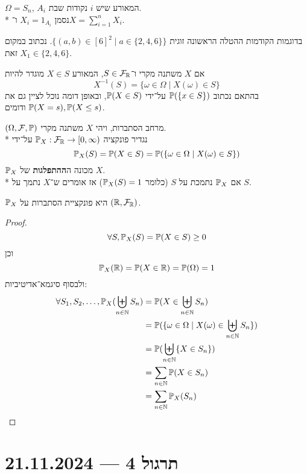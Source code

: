 \begin{example}
	$\Omega = S_n$, $A_i$ המאורע שיש $i$ נקודות שבת. \\*
	נסמן $X_i = 1_{A_i}$ ו־$X = \sum_{i = 1}^n X_i$.
\end{example}
בדוגמות הקודמות ההטלה הראשונה זוגית $\{ (a, b) \in {[6]}^2 \mid a \in \{2, 4, 6\}\}$. נכתוב במקום זאת $X_1 \in \{2, 4, 6\}$.
\begin{definition}
	אם $X$ משתנה מקרי ו־$S \in \mathcal{F}_{\mathbb{R}}$, המאורע $X \in S$ מוגדר להיות
	\[
		X^{-1}(S) = \{ \omega \in \Omega \mid X(\omega) \in S \}
	\]
	בהתאם נכתוב $\mathbb{P}(\{x \in S\})$ על־ידי $\mathbb{P}(X \in S)$, ובאופן דומה נוכל לציין גם את $\mathbb{P}(X = s), \mathbb{P}(X \le s)$ ודומים.
\end{definition}
\begin{definition}
	$(\Omega, \mathcal{F}, \mathbb{P})$ מרחב הסתברות, ויהי $X$ משתנה מקרי. \\*
	נגדיר פונקציה $\mathbb{P}_X : \mathcal{F}_{\mathbb{R}} \to [0, \infty)$ על־ידי
	\[
		\mathbb{P}_X(S) = \mathbb{P}(X \in S) = \mathbb{P}(\{\omega \in \Omega \mid X(\omega) \in S \})
	\]
	$\mathbb{P}_X$ מכונה ה\textbf{ההתפלגות} של $X$. \\*
	אם $\mathbb{P}_X$ נתמכת על $S$ (כלומר $\mathbb{P}_X(S) = 1$) אז אומרים ש־$X$ נתמך על $S$.
\end{definition}
\begin{proposition}
	$\mathbb{P}_X$ היא פונקציית הסתברות על $(\mathbb{R}, \mathcal{F}_{\mathbb{R}})$.
\end{proposition}
\begin{proof}
	\[
		\forall S, \mathbb{P}_X(S) = \mathbb{P}(X \in S) \ge 0
	\]
	וכן
	\[
		\mathbb{P}_X(\mathbb{R}) = \mathbb{P}(X \in \mathbb{R}) = \mathbb{P}(\Omega) = 1
	\]
	ולבסוף סיגמא־אדיטיביות:
	\begin{align*}
		\forall S_1, S_2, \dots, \mathbb{P}_X(\biguplus_{n \in \mathbb{N}} S_n)
		& = \mathbb{P}(X \in \biguplus_{n \in \mathbb{N}} S_n) \\
		& = \mathbb{P}(\{\omega \in \Omega \mid X(\omega) \in \biguplus_{n \in \mathbb{N}} S_n \}) \\
		& = \mathbb{P}(\biguplus_{n \in \mathbb{N}} \{ X \in S_n \}) \\
		& = \sum_{n \in \mathbb{N}} \mathbb{P}(X \in S_n) \\
		& = \sum_{n \in \mathbb{N}} \mathbb{P}_X(S_n)
	\end{align*}
\end{proof}

\section{תרגול 4 --- 21.11.2024}

